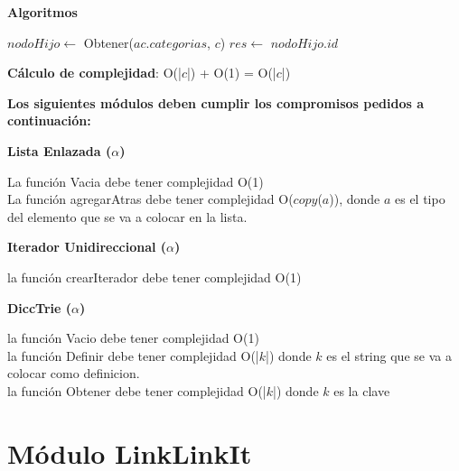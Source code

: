 \documentclass[10pt, a4paper]{article}
\let\TipoVariable=\texttt
\let\ModificadorArgumento=\textbf
\newcommand{\In}[2]{\ModificadorArgumento{in} \ensuremath{#1}\,: \TipoVariable{#2}\xspace}
\newenvironment{Servicios Usados}{%
  \vspace*{2ex}
  \noindent\textbf{\Large Servicios Usados}%
  \vspace*{2ex}
}{}
\newenvironment{Algoritmos}{%
  \vspace*{2ex}%
  \noindent\textbf{\Large Algoritmos}%
  \vspace*{2ex}%
}{}
\newcommand{\modTitulo}[1]{
  \vspace*{1ex}\par\noindent\textbf{\large #1}\par
}
\newcommand{\DRef}{\ensuremath{\rightarrow}}
\begin{document}
\begin{Algoritmos}
\begin{algorithm}[H]
\caption*{iID(\In{ac}{abCat}, \In{c}{categoria}) $\DRef res$ : \TipoVariable{Nat}}
\begin{algorithmic}[1]
	\State $nodoHijo \gets$ Obtener($ac.categorias$, $c$)
	\State $res \gets$ $nodoHijo.id$
\end{algorithmic}
\textbf{C\'alculo de complejidad}: O(|$c$|) + O(1) = O(|$c$|)
\end{algorithm}

\end{Algoritmos}

\begin{Servicios Usados}

\textbf{Los siguientes m\'odulos deben cumplir los compromisos pedidos a continuaci\'on:}

\modTitulo{Lista Enlazada ($\alpha$)}

La función Vacia debe tener complejidad O(1)\\
La función agregarAtras debe tener complejidad O($copy$($a$)), donde $a$ es el tipo del elemento que se va a colocar en la lista.

\modTitulo{Iterador Unidireccional ($\alpha$)}

la función crearIterador debe tener complejidad O(1) 

\modTitulo{DiccTrie ($\alpha$)}

la función Vacio debe tener complejidad O(1) \\
la función Definir debe tener complejidad O(|$k$|) donde $k$ es el string que se va a colocar como definicion. \\
la función Obtener debe tener complejidad O(|$k$|) donde $k$ es la clave

\end{Servicios Usados}

\section{M\'odulo LinkLinkIt}
\end{document}
